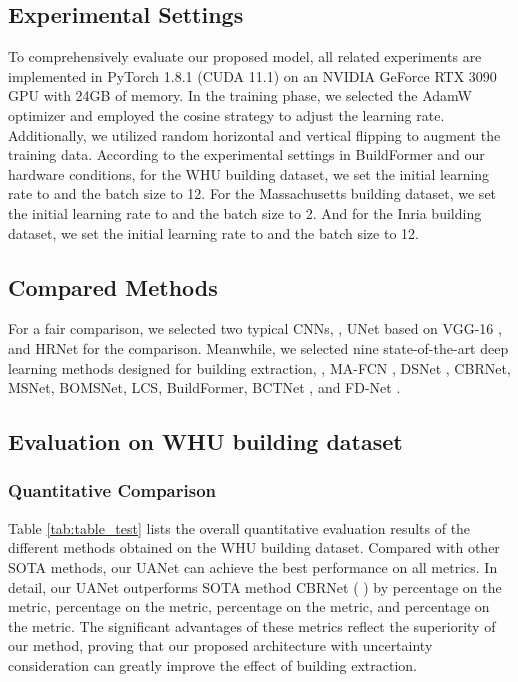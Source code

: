 \documentclass[lettersize,journal]{IEEEtran}
\begin{document}
\vspace{-1.0em}

\vspace{-1.0em}

\subsection{Experimental Settings}
To comprehensively evaluate our proposed model, all related experiments are implemented in PyTorch 1.8.1 (CUDA 11.1) on an NVIDIA GeForce RTX 3090 GPU with 24GB of memory. In the training phase, we selected the AdamW \cite{AdamW} optimizer and employed the cosine strategy to adjust the learning rate. Additionally, we utilized random horizontal and vertical flipping to augment the training data. According to the experimental settings in BuildFormer \cite{BuildFormer} and our hardware conditions, for the WHU building dataset, we set the initial learning rate to  and the batch size to 12. For the Massachusetts building dataset, we set the initial learning rate to  and the batch size to 2. And for the Inria building dataset, we set the initial learning rate to  and the batch size to 12.
 
\subsection{Compared Methods}
For a fair comparison, we selected two typical CNNs, , UNet\cite{UNet} based on VGG-16 \cite{VGG}, and HRNet\cite{HRNet} for the comparison. Meanwhile, we selected nine state-of-the-art deep learning methods designed for building extraction, , MA-FCN \cite{MA_FCN}, DSNet \cite{DSNet}, CBRNet\cite{CBRNet}, MSNet\cite{MSNet}, BOMSNet\cite{BOMSC-Net}, LCS\cite{LCS}, BuildFormer\cite{BuildFormer}, BCTNet \cite{BCTNet}, and FD-Net \cite{FD-Net}.

\subsection{Evaluation on WHU building dataset}
\subsubsection{Quantitative Comparison}
Table \ref{tab:table_test} lists the overall quantitative evaluation results of the different methods obtained on the WHU building dataset. Compared with other SOTA methods, our UANet can achieve the best performance on all metrics. In detail, our UANet outperforms SOTA method CBRNet ( \cite{CBRNet}) by  percentage on the  metric,  percentage on the  metric,  percentage on the  metric, and  percentage on the  metric. The significant advantages of these metrics reflect the superiority of our method, proving that our proposed architecture with uncertainty consideration can greatly improve the effect of building extraction.
\end{document}
